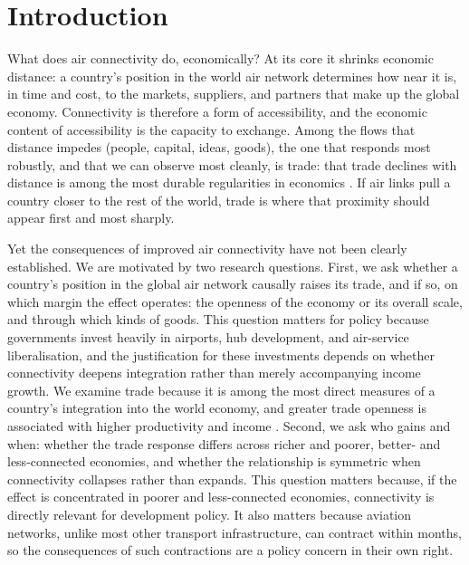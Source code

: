\linenumbers

\section{Introduction}
What does air connectivity do, economically? At its core it shrinks economic distance: a country's position in the world air network determines how near it is, in time and cost, to the markets, suppliers, and partners that make up the global economy. Connectivity is therefore a form of accessibility, and the economic content of accessibility is the capacity to exchange. Among the flows that distance impedes (people, capital, ideas, goods), the one that responds most robustly, and that we can observe most cleanly, is trade: that trade declines with distance is among the most durable regularities in economics \citep{Redding_2004,Hummels_2007}. If air links pull a country closer to the rest of the world, trade is where that proximity should appear first and most sharply.

Yet the consequences of improved air connectivity have not been clearly established. We are motivated by two research questions. First, we ask whether a country's position in the global air network causally raises
its trade, and if so, on which margin the effect operates: the openness of the economy or its overall scale, and through which kinds of goods. This question matters for policy because governments invest heavily in
airports, hub development, and air-service liberalisation, and the justification for these investments depends on whether connectivity deepens integration rather than merely accompanying income growth. We examine trade because it is among the most direct measures of a country's integration into the world economy, and greater trade openness is associated with higher productivity and income \citep{Frankel_1999,Alcala_2004,Feyrer_2019}. Second, we ask who gains and when: whether the trade response differs across richer and poorer, better- and less-connected economies, and whether the relationship is symmetric when connectivity collapses rather than expands. This question matters because, if the effect is concentrated in poorer and less-connected economies, connectivity is directly relevant for
development policy. It also matters because aviation networks, unlike most other transport infrastructure, can contract within months, so the consequences of such contractions are a policy concern in their own right.

